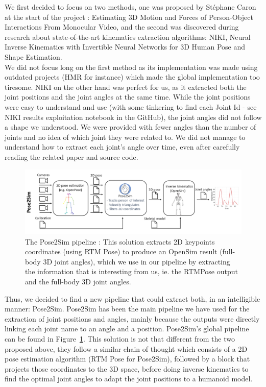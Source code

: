 \documentclass{amsart}
\theoremstyle{definition}
\theoremstyle{plain}
\begin{document}
We first decided to focus on two methods, one was proposed by Stéphane Caron at the start of the project : Estimating 3D Motion and Forces of Person-Object Interactions From Monocular Video\cite{Li_2019}, and the second was discovered during research about state-of-the-art kinematics extraction algorithms: NIKI, Neural Inverse Kinematics with Invertible Neural Networks for 3D Human Pose and Shape Estimation\cite{li2023niki}.\\

We did not focus long on the first method as its implementation was made using outdated projects (HMR for instance) which made the global implementation too tiresome. NIKI on the other hand was perfect for us, as it extracted both the joint positions and the joint angles at the same time. While the joint positions were easy to understand and use (with some tinkering to find each Joint Id - see NIKI results exploitation notebook in the GitHub), the joint angles did not follow a shape we understood. We were provided with fewer angles than the number of joints and no idea of which joint they were related to. We did not manage to understand how to extract each joint's angle over time, even after carefully reading the related paper and source code. \\

\begin{figure}
  \includegraphics[width = 0.99 \columnwidth]{img/pose2sim_pipeline.png}
  \caption{The Pose2Sim pipeline : This solution extracts 2D keypoints coordinates (using RTM Pose\cite{RTMPose}) to produce an OpenSim result (full-body 3D joint angles), which we use in our pipeline by extracting the information that is interesting from us, ie. the RTMPose output and the full-body 3D joint angles.}\label{fig:pose2sim_pipeline}
\end{figure}

Thus, we decided to find a new pipeline that could extract both, in an intelligible manner: Pose2Sim\cite{Pose2Sim}. Pose2Sim has been the main pipeline we have used for the extraction of joint positions and angles, mainly because the outputs were directly linking each joint name to an angle and a position. Pose2Sim's global pipeline can be found in Figure~\ref{fig:pose2sim_pipeline}. This solution is not that different from the two proposed above, they follow a similar chain of thought which consists of a 2D pose estimation algorithm (RTM Pose\cite{RTMPose} for Pose2Sim), followed by a block that projects those coordinates to the 3D space, before doing inverse kinematics to find the optimal joint angles to adapt the joint positions to a humanoid model. \\
\end{document}
